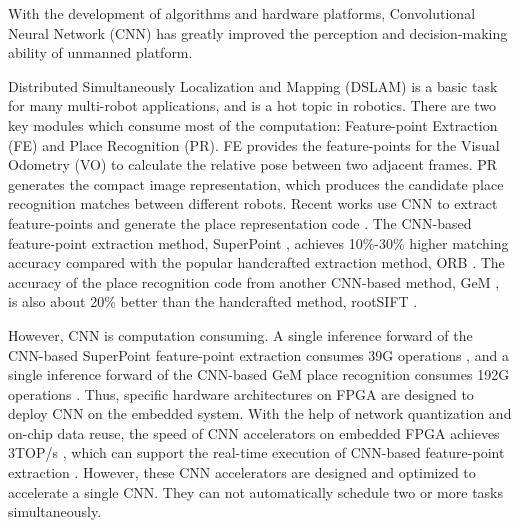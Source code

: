 With the development of algorithms and hardware platforms, Convolutional Neural Network (CNN) has greatly improved the perception and decision-making ability of unmanned platform. 

Distributed Simultaneously Localization and Mapping (DSLAM) is a basic task for many multi-robot applications, and is a hot topic in robotics. There are two key modules which consume most of the computation: Feature-point Extraction (FE) and Place Recognition (PR). 
FE provides the feature-points for the Visual Odometry (VO) to calculate the relative pose between two adjacent frames. PR generates the compact image representation, which produces the candidate place recognition matches between different robots. 
Recent works use CNN to extract feature-points \cite{detone2018superpoint, simo2015discriminative, yi2016lift} and generate the place representation code \cite{arandjelovic2016netvlad, radenovic2018fine}. 
The CNN-based feature-point extraction method, SuperPoint \cite{detone2018superpoint}, achieves 10\%-30\% higher matching accuracy compared with the popular handcrafted extraction method, ORB \cite{Mur-Artal:2017281}.
The accuracy of the place recognition code from another CNN-based method, GeM \cite{radenovic2018fine}, is also about 20\% better than the handcrafted method, rootSIFT \cite{jegou2014triang}.

However, CNN is computation consuming. A single inference forward of the CNN-based SuperPoint feature-point extraction consumes 39G operations \cite{detone2018superpoint}, and a single inference forward of the CNN-based GeM place recognition consumes 192G operations \cite{radenovic2018fine}.
Thus, specific hardware architectures on FPGA \cite{guo2017angel,yu2018instruction,li_high_2016,qiu2016going,lu_evaluating_2017} are designed to deploy CNN on the embedded system.
With the help of network quantization and on-chip data reuse, the speed of CNN accelerators on embedded FPGA achieves 3TOP/s \cite{lu_evaluating_2017}, which can support the real-time execution of CNN-based feature-point extraction \cite{detone2018superpoint}.
However, these CNN accelerators are designed and optimized to accelerate a single CNN. They can not automatically schedule two or more tasks simultaneously. 



